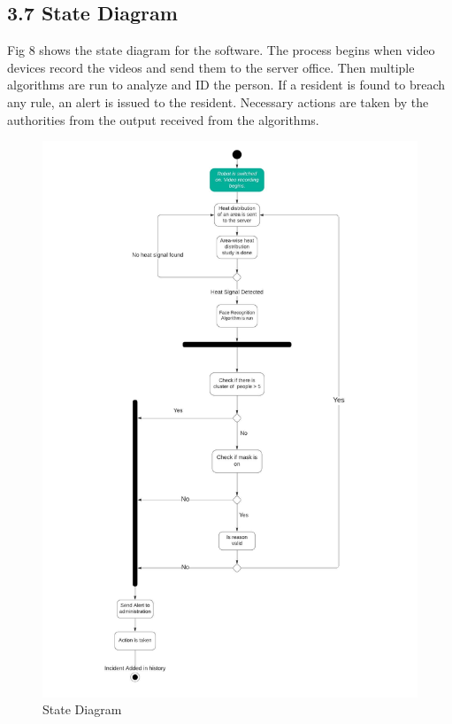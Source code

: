 \documentclass[eng]{FCEFyN-class}
\begin{document}
\subsection{3.7 State Diagram}
Fig 8 shows the state diagram for the software. The process begins when video devices record the videos and send them to the server office. Then multiple algorithms are run to analyze and ID the person. If a resident is found to breach any rule, an alert is issued to the resident. Necessary actions are taken by the authorities from the output received from the algorithms.
\begin{figure}[!htb]
 \includegraphics[scale=0.4]{filesFCEFyN-class/state_diagr.jpeg} 
 \caption{State Diagram} \label{fig-2}
 \FloatBarrier
\end{figure}
\end{document}
